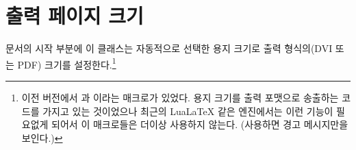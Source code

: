 \section{출력 페이지 크기}
\label{sec:emitting-page-size}

문서의 시작 부분에 이 클래스는 자동적으로 선택한 용지 크기로 출력 형식의(DVI 또는 PDF) 크기를 설정한다.\footnote{이전 버전에서 과 이라는 매크로가 있었다. 용지 크기를 출력 포맷으로
송출하는 코드를 가지고 있는 것이었으나 최근의 LuaLaTeX 같은 엔진에서는 이런
기능이 필요없게 되어서 이 매크로들은 더이상 사용하지 않는다. (사용하면 경고 메시지만을 보인다.)}




